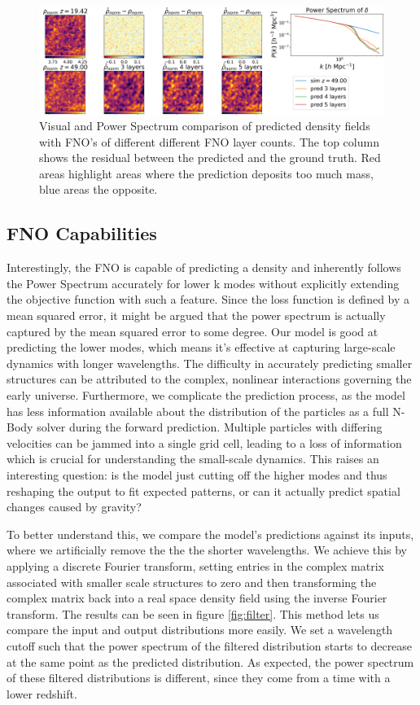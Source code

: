 \documentclass{article}
\begin{document}
\begin{figure}[h]
    \centering
    \includegraphics[width=0.95\linewidth]{img/compare_layers_2.png}
    \caption{Visual and Power Spectrum comparison of predicted density fields with FNO's of different different FNO layer counts. The top column shows the residual between the predicted and the ground truth. Red areas highlight areas where the prediction deposits too much mass, blue areas the opposite. }
    \label{fig:layer-A}
\end{figure}

\subsection{FNO Capabilities}

Interestingly, the FNO is capable of predicting a density and inherently follows the Power Spectrum accurately for lower k modes without explicitly extending the objective function with such a feature. Since the loss function is defined by a mean squared error, it might be argued that the power spectrum is actually captured by the mean squared error to some degree.
Our model is good at predicting the lower modes, which means it's effective at capturing large-scale dynamics with longer wavelengths. The difficulty in accurately predicting smaller structures can be attributed to the complex, nonlinear interactions governing the early universe. Furthermore, we complicate the prediction process, as the model has less information available about the distribution of the particles as a full N-Body solver during the forward prediction. Multiple particles with differing velocities can be jammed into a single grid cell, leading to a loss of information which is crucial for understanding the small-scale dynamics. This raises an interesting question: is the model just cutting off the higher modes and thus reshaping the output to fit expected patterns, or can it actually predict spatial changes caused by gravity? 

To better understand this, we compare the model's predictions against its inputs, where we artificially remove the the the shorter wavelengths. We achieve this by applying a discrete Fourier transform, setting entries in the complex matrix  associated with smaller scale structures to zero and then transforming the complex matrix back into a real space density field using the inverse Fourier transform. The results can be seen in figure \ref{fig:filter}. This method lets us compare the input and output distributions more easily. We set a wavelength cutoff such that the power spectrum of the filtered distribution starts to decrease at the same point as the predicted distribution. As expected, the power spectrum of these filtered distributions is different, since they come from a time with a lower redshift.
\end{document}
